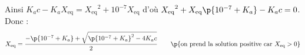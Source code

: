 \documentclass[a4paper,french,bookmarks]{article}
\begin{document}
\begin{enumerate}
{            Ainsi $K_ac - K_aX_\text{eq} = {X_\text{eq}}^2 + 10^{-7}X_\text{eq}$ d'où ${X_\text{eq}}^2 + X_\text{eq}\p{10^{-7} + K_a} - K_ac = 0$. Donc :
            \[ X_\text{eq} = \dfrac{-\p{10^{-7} + K_a} + \sqrt{\p{10^{-7} + K_a}^2 - 4K_ac}}{2} \qquad\p{\text{on prend la solution positive car} \ X_\text{eq} > 0}\]
        }
        \nobefore\yesafter
        \yesbefore
        
    \end{enumerate}
\end{document}
